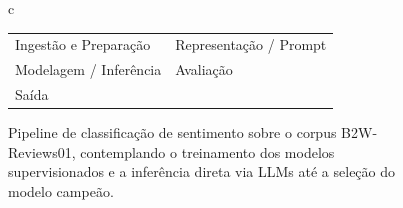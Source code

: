 \documentclass{IEEEtran}
\begin{document}
\begin{figure}[htbp]
{\begin{tabular}{c}
    \begin{tabular}{ll}
      \fcolorbox{black}{colorIngestao}{\rule{0pt}{4pt}\rule{4pt}{0pt}} \scriptsize Ingestão e Preparação & 
      \fcolorbox{black}{colorRepres}{\rule{0pt}{4pt}\rule{4pt}{0pt}} \scriptsize Representação / Prompt \\
      \fcolorbox{black}{colorClassif}{\rule{0pt}{4pt}\rule{4pt}{0pt}} \scriptsize Modelagem / Inferência & 
      \fcolorbox{black}{colorAvaliacao}{\rule{0pt}{4pt}\rule{4pt}{0pt}} \scriptsize Avaliação \\
      \fcolorbox{black}{colorSaida}{\rule{0pt}{4pt}\rule{4pt}{0pt}} \scriptsize Saída & \\
    \end{tabular}

  \end{tabular}%
  } %
  \caption{Pipeline de classificação de sentimento sobre o corpus B2W-Reviews01, contemplando o treinamento dos modelos supervisionados e a inferência direta via LLMs até a seleção do modelo campeão.}
  \label{fig:pipeline_classification}
\end{figure}




\end{document}
